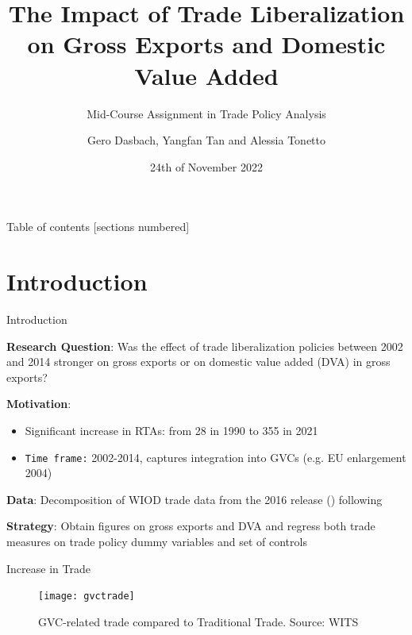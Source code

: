 \documentclass[10pt]{beamer}
\title{The Impact of Trade Liberalization on Gross Exports and Domestic Value Added}
\subtitle{Mid-Course Assignment in Trade Policy Analysis}
\date{24th of November 2022}
\author{Gero Dasbach, Yangfan Tan and Alessia Tonetto}
\institute{}
\begin{document}



\maketitle


\begin{frame}{Table of contents}
  [sections numbered]
  \tableofcontents[hideallsubsections] %
\end{frame}


\section{Introduction}

\begin{frame}[fragile]{Introduction}

\textbf{Research Question}: Was the effect of trade liberalization policies between 2002 and 2014 stronger on gross exports or on domestic value added (DVA) in gross exports?

\textbf{Motivation}:
\begin{itemize}
    \item Significant increase in RTAs: from 28 in 1990 to 355 in 2021
	\item \texttt{Time frame:} 2002-2014, captures integration into GVCs (e.g. EU enlargement 2004)
\end{itemize}

\textbf{Data}: Decomposition of WIOD trade data from the 2016 release (\cite{timmer2015illustrated}) following \cite{borin2019measuring}

\textbf{Strategy}: Obtain figures on gross exports and DVA and regress both trade measures on trade policy dummy variables and set of controls

\end{frame}

\begin{frame}[fragile]{Increase in Trade}
  \begin{figure}[h]
    \caption{GVC-related trade compared to Traditional Trade. Source: WITS}
    \centering
    \texttt{[image: gvctrade]}
\end{figure}
\end{frame}
\end{document}
